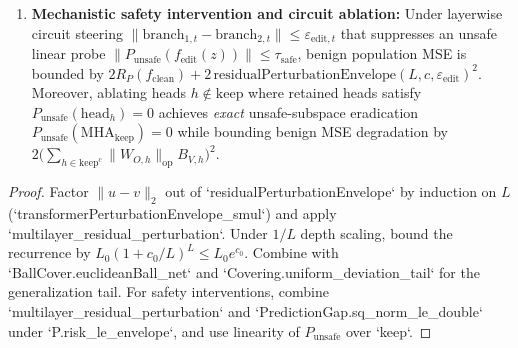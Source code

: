\begin{lemma}
\begin{enumerate}
\item \textbf{Mechanistic safety intervention and circuit ablation:} Under layerwise circuit steering $\|\mathrm{branch}_{1,t} - \mathrm{branch}_{2,t}\| \le \varepsilon_{\mathrm{edit},t}$ that suppresses an unsafe linear probe $\|P_{\mathrm{unsafe}}(f_{\mathrm{edit}}(z))\| \le \tau_{\mathrm{safe}}$, benign population MSE is bounded by $2 R_P(f_{\mathrm{clean}}) + 2\,\mathrm{residualPerturbationEnvelope}(L, c, \varepsilon_{\mathrm{edit}})^2$. Moreover, ablating heads $h\notin\mathrm{keep}$ where retained heads satisfy $P_{\mathrm{unsafe}}(\mathrm{head}_h) = 0$ achieves \emph{exact} unsafe-subspace eradication $P_{\mathrm{unsafe}}(\mathrm{MHA}_{\mathrm{keep}}) = 0$ while bounding benign MSE degradation by $2\bigl(\sum_{h\in\mathrm{keep}^c} \|W_{O,h}\|_{\mathrm{op}} B_{V,h}\bigr)^2$.
\end{enumerate}
\end{lemma}
\begin{proof}
\leanok
Factor $\|u-v\|_2$ out of `residualPerturbationEnvelope` by induction on $L$ (`transformerPerturbationEnvelope_smul`) and apply `multilayer_residual_perturbation`. Under $1/L$ depth scaling, bound the recurrence by $L_0(1+c_0/L)^L \le L_0 e^{c_0}$. Combine with `BallCover.euclideanBall_net` and `Covering.uniform_deviation_tail` for the generalization tail. For safety interventions, combine `multilayer_residual_perturbation` and `PredictionGap.sq_norm_le_double` under `P.risk_le_envelope`, and use linearity of $P_{\mathrm{unsafe}}$ over `keep`.
\end{proof}

